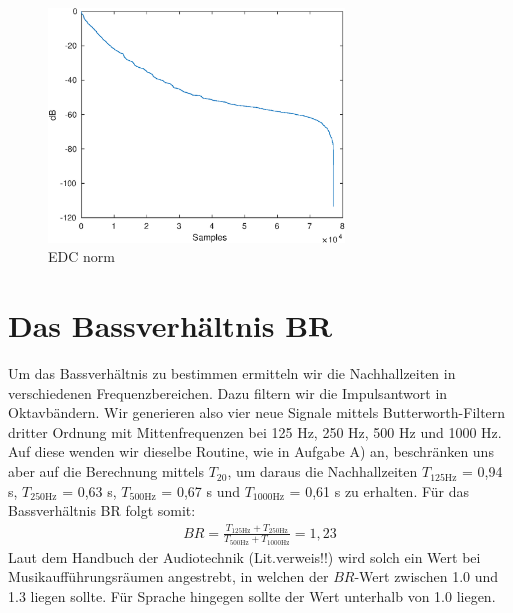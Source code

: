 \begin{figure}[H]
    \center
    \includegraphics[width = 0.7\textwidth]{figures/EDC_norm.eps}
    \caption{EDC norm}
    \label{fig:edc}
\end{figure}

\section{Das Bassverhältnis $\mathbf{BR}$}
\label{sec:br}
Um das Bassverhältnis zu bestimmen ermitteln wir die Nachhallzeiten in verschiedenen Frequenzbereichen. Dazu filtern wir die Impulsantwort in Oktavbändern.
Wir generieren also vier neue Signale mittels Butterworth-Filtern dritter Ordnung mit Mittenfrequenzen bei 125 Hz, 250 Hz, 500 Hz und 1000 Hz. Auf diese wenden wir dieselbe Routine, wie in Aufgabe A) an, beschränken uns aber auf die Berechnung mittels $T_20$, um daraus die Nachhallzeiten $T_{125 \mathrm{Hz}}$ = 0,94 s, $T_{250 \mathrm{Hz}}$ = 0,63 s, $T_{500 \mathrm{Hz}}$ = 0,67 s und $T_{1000 \mathrm{Hz}}$ = 0,61 s zu erhalten.
Für das Bassverhältnis BR folgt somit:
\begin{align*}
BR = \frac{T_{125 \mathrm{Hz}} + T_{250 \mathrm{Hz}}}{T_{500 \mathrm{Hz}} + T_{1000 \mathrm{Hz}}} = 1,23
\end{align*}  
Laut dem Handbuch der Audiotechnik (Lit.verweis!!) wird solch ein Wert bei Musikaufführungsräumen angestrebt, in welchen der $BR$-Wert zwischen 1.0 und 1.3 liegen sollte.
Für Sprache hingegen sollte der Wert unterhalb von 1.0 liegen.

